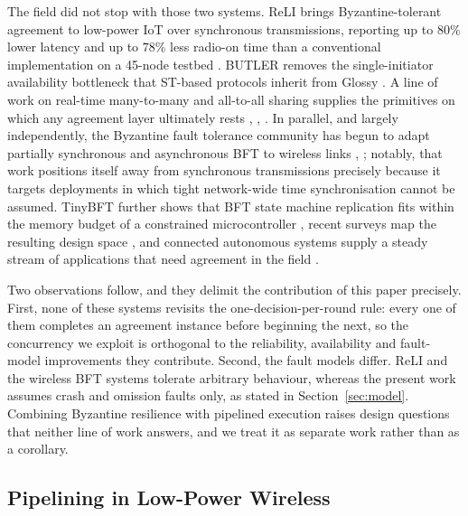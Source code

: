 \documentclass[journal]{IEEEtran}
\newcommand{\ReLI}{ReLI}                  %
\begin{document}
The field did not stop with those two systems. {\ReLI} brings
Byzantine-tolerant agreement to low-power IoT over synchronous
transmissions, reporting up to $80\%$ lower latency and up to $78\%$ less
radio-on time than a conventional implementation on a 45-node testbed
\cite{goyal22reli}. BUTLER removes the single-initiator availability
bottleneck that ST-based protocols inherit from Glossy
\cite{mager22butler}. A line of work on real-time many-to-many and
all-to-all sharing supplies the primitives on which any agreement layer
ultimately rests \cite{debadarshini23timecast},
\cite{debadarshini23synccast}, \cite{debadarshini24structure}. In
parallel, and largely independently, the Byzantine fault tolerance
community has begun to adapt partially synchronous and asynchronous BFT to
wireless links \cite{liu25partiallysync}, \cite{liu25asyncbft}; notably,
that work positions itself away from synchronous transmissions precisely
because it targets deployments in which tight network-wide time
synchronisation cannot be assumed. TinyBFT further shows that BFT state
machine replication fits within the memory budget of a constrained
microcontroller \cite{boehm24tinybft}, recent surveys map the resulting
design space \cite{zou24survey}, and connected autonomous systems supply a
steady stream of applications that need agreement in the field
\cite{wu25dag}.

Two observations follow, and they delimit the contribution of this paper
precisely. First, none of these systems revisits the
one-decision-per-round rule: every one of them completes an agreement
instance before beginning the next, so the concurrency we exploit is
orthogonal to the reliability, availability and fault-model improvements
they contribute. Second, the fault models differ. {\ReLI} and the wireless
BFT systems tolerate arbitrary behaviour, whereas the present work assumes
crash and omission faults only, as stated in Section~\ref{sec:model}.
Combining Byzantine resilience with pipelined execution raises design
questions that neither line of work answers, and we treat it as separate
work rather than as a corollary.

\subsection{Pipelining in Low-Power Wireless}
\label{sec:back-pipelining}
\end{document}
